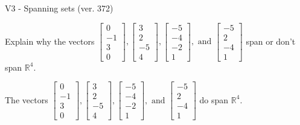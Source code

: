\begin{exercise}
  \begin{exerciseTitle}V3 - Spanning sets (ver. 372)\end{exerciseTitle}
  \begin{exerciseStatement}
    Explain why the vectors \(\left[\begin{array}{r}
0 \\
-1 \\
3 \\
0
\end{array}\right] , \left[\begin{array}{r}
3 \\
2 \\
-5 \\
4
\end{array}\right] , \left[\begin{array}{r}
-5 \\
-4 \\
-2 \\
1
\end{array}\right] , \text{ and } \left[\begin{array}{r}
-5 \\
2 \\
-4 \\
1
\end{array}\right]\) span or don't span \(\mathbb{R}^4\). 
	


  \end{exerciseStatement}
  \begin{exerciseAnswer}
   The vectors \(\left[\begin{array}{r}
0 \\
-1 \\
3 \\
0
\end{array}\right] , \left[\begin{array}{r}
3 \\
2 \\
-5 \\
4
\end{array}\right] , \left[\begin{array}{r}
-5 \\
-4 \\
-2 \\
1
\end{array}\right] , \text{ and } \left[\begin{array}{r}
-5 \\
2 \\
-4 \\
1
\end{array}\right]\) 
  	 do  
	span \(\mathbb{R}^4\).
  


  \end{exerciseAnswer}
\end{exercise}